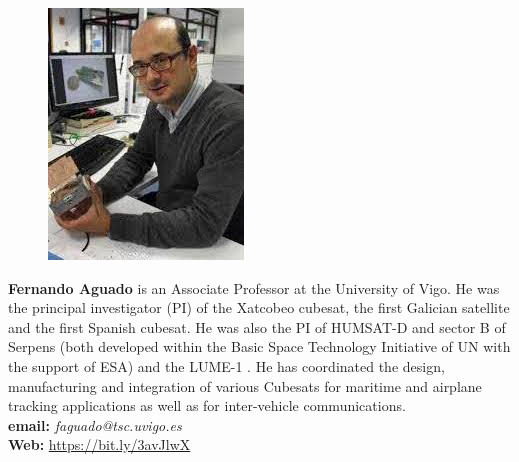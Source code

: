 \documentclass[12pt]{article}
\begin{document}
\parbox{6.5in}{
\begin{figure}
  \centering
  \includegraphics[width=.75\linewidth]{fig/FAguado.jpg}
\end{figure}
\textbf{Fernando Aguado} is an Associate Professor at the University
of Vigo. He was the principal investigator (PI) of the Xatcobeo
cubesat, the first Galician satellite and the first Spanish
cubesat. He was also the PI of HUMSAT-D and sector B of Serpens (both
developed within the Basic Space Technology Initiative of UN with the
support of ESA) and the LUME-1 \smle. He has coordinated the design,
manufacturing and integration of various Cubesats for maritime and
airplane tracking applications as well as for inter-vehicle
communications. 
\\
\textbf{email: }\emph{faguado@tsc.uvigo.es} \\
\textbf{Web: }\url{https://bit.ly/3avJlwX}\\
}
\end{document}
